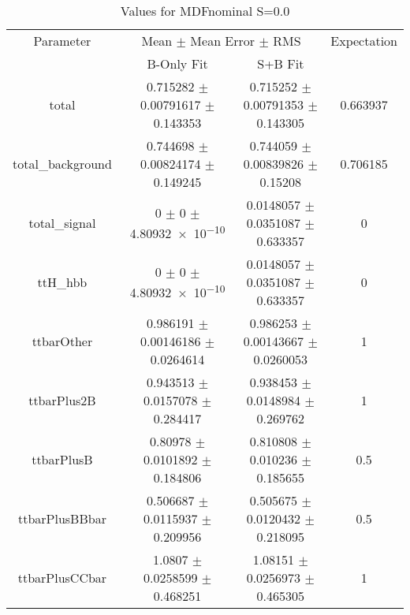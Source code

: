 \begin{table}
\centering
\caption{Values for MDFnominal S=0.0}
\begin{tabular}{cccc}
\toprule
Parameter & \multicolumn{2}{c}{Mean $\pm$ Mean Error $\pm$ RMS} & Expectation\\
 & B-Only Fit & S+B Fit & \\
\midrule
total & \num{0.715282} $\pm$ \num{0.00791617} $\pm$ \num{0.143353} & \num{0.715252} $\pm$ \num{0.00791353} $\pm$ \num{0.143305} & \num{0.663937}\\
total\_background & \num{0.744698} $\pm$ \num{0.00824174} $\pm$ \num{0.149245} & \num{0.744059} $\pm$ \num{0.00839826} $\pm$ \num{0.15208} & \num{0.706185}\\
total\_signal & \num{0} $\pm$ \num{0} $\pm$ \num{4.80932e-10} & \num{0.0148057} $\pm$ \num{0.0351087} $\pm$ \num{0.633357} & \num{0}\\
ttH\_hbb & \num{0} $\pm$ \num{0} $\pm$ \num{4.80932e-10} & \num{0.0148057} $\pm$ \num{0.0351087} $\pm$ \num{0.633357} & \num{0}\\
ttbarOther & \num{0.986191} $\pm$ \num{0.00146186} $\pm$ \num{0.0264614} & \num{0.986253} $\pm$ \num{0.00143667} $\pm$ \num{0.0260053} & \num{1}\\
ttbarPlus2B & \num{0.943513} $\pm$ \num{0.0157078} $\pm$ \num{0.284417} & \num{0.938453} $\pm$ \num{0.0148984} $\pm$ \num{0.269762} & \num{1}\\
ttbarPlusB & \num{0.80978} $\pm$ \num{0.0101892} $\pm$ \num{0.184806} & \num{0.810808} $\pm$ \num{0.010236} $\pm$ \num{0.185655} & \num{0.5}\\
ttbarPlusBBbar & \num{0.506687} $\pm$ \num{0.0115937} $\pm$ \num{0.209956} & \num{0.505675} $\pm$ \num{0.0120432} $\pm$ \num{0.218095} & \num{0.5}\\
ttbarPlusCCbar & \num{1.0807} $\pm$ \num{0.0258599} $\pm$ \num{0.468251} & \num{1.08151} $\pm$ \num{0.0256973} $\pm$ \num{0.465305} & \num{1}\\
\bottomrule
\end{tabular}
\end{table}